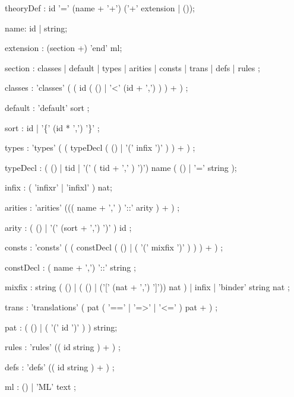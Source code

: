 \begin{rail}

theoryDef : id '=' (name + '+') ('+' extension | ());

name: id | string;

extension : (section +) 'end' ml;

section : classes
        | default
        | types
        | arities
        | consts
        | trans
        | defs
        | rules
        ;

classes : 'classes' ( ( id (  ()
                            | '<' (id + ',')
                           ) 
                       ) + )
        ;

default : 'default' sort 
        ;

sort :  id
     | '\{' (id * ',') '\}'
     ;

types : 'types' ( ( typeDecl ( () | '(' infix ')' ) ) + )
      ;

typeDecl : ( () | tid | '(' ( tid + ',' ) ')') name ( () | '='  string );

infix : ( 'infixr' | 'infixl' ) nat;


arities : 'arities' ((( name + ',' ) '::' arity ) + )
        ;

arity   : ( () 
          | '(' (sort + ',') ')' 
          ) id
        ;


consts : 'consts' ( ( constDecl ( () | ( '(' mixfix ')' ) ) ) + )
       ;

constDecl : ( name + ',') '::' string ;


mixfix :  string ( () | ( () | ('[' (nat + ',') ']')) nat )
       | infix
       | 'binder' string nat ;

trans : 'translations' ( pat ( '==' | '=>' | '<=' ) pat + )
      ;

pat : ( () | ( '(' id ')' ) ) string;

rules : 'rules' (( id string ) + )
      ;

defs : 'defs' (( id string ) + )
     ;

ml :  ()
   | 'ML' text
   ;

\end{rail}
